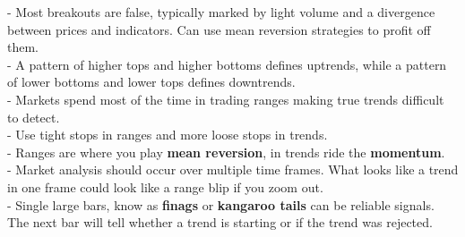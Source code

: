\documentclass[12pt,fullpage]{article}
\begin{document}
- Most breakouts are false, typically marked by light volume and a divergence between prices and indicators. Can use mean reversion strategies to profit off them.\\
- A pattern of higher tops and higher bottoms defines uptrends, while a pattern of lower bottoms and lower tops defines downtrends.\\
- Markets spend most of the time in trading ranges making true trends difficult to detect.\\
- Use tight stops in ranges and more loose stops in trends.\\
- Ranges are where you play \textbf{mean reversion}, in trends ride the \textbf{momentum}.\\
- Market analysis should occur over multiple time frames. What looks like a trend in one frame could look like a range blip if you zoom out.\\
- Single large bars, know as \textbf{finags} or \textbf{kangaroo tails} can be reliable signals. The next bar will tell whether a trend is starting or if the trend was rejected.\\
\end{document}
